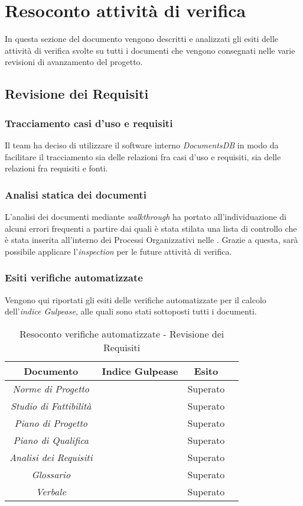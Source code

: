 \newpage
\section{Resoconto attività di verifica}
In questa sezione del documento vengono descritti e analizzati gli esiti delle attività di verifica svolte su tutti i documenti che vengono consegnati nelle varie revisioni di avanzamento del progetto.

\subsection{Revisione dei Requisiti}

\subsubsection{Tracciamento casi d'uso e requisiti}
Il team ha deciso di utilizzare il software interno \textit{DocumentsDB} in modo da facilitare il tracciamento sia delle relazioni fra casi d'uso e requisiti, sia delle relazioni fra requisiti e fonti.

\subsubsection{Analisi statica dei documenti}
L'analisi dei documenti mediante \textit{walkthrough} ha portato all'individuazione di alcuni errori frequenti a partire dai quali è stata stilata una lista di controllo che è stata inserita all'interno dei Processi Organizzativi nelle \textit{\NdP}. Grazie a questa, sarà possibile applicare l'\textit{inspection} per le future attività di verifica.

\subsubsection{Esiti verifiche automatizzate}
Vengono qui riportati gli esiti delle verifiche automatizzate per il calcolo dell'\textit{indice Gulpease}, alle quali sono stati sottoposti tutti i documenti.
\begin{table}[h]
\begin{center}
\begin{tabular}{|c|c|c|c|}
\hline Documento & Indice Gulpease & Esito\\
\hline
\emph{Norme di Progetto} &  & Superato \\
\emph{Studio di Fattibilità} &  & Superato \\
\emph{Piano di Progetto} &  & Superato \\
\emph{Piano di Qualifica} &   & Superato \\
\emph{Analisi dei Requisiti} &  & Superato \\
\emph{Glossario} &  & Superato \\
\emph{Verbale} &  & Superato \\
\hline
\end{tabular}
\caption{Resoconto verifiche automatizzate - Revisione dei Requisiti}
\end{center}
\end{table}